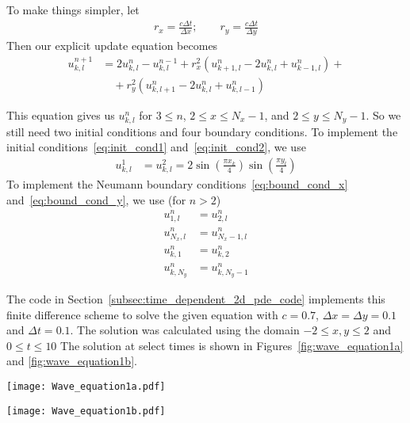 \documentclass[twocolumn]{myarticle}
\numberwithin{equation}{section}
\begin{document}
To make things simpler, let
\begin{align}
    r_x = \frac{c \Delta t}{ \Delta x}; \qquad r_y = \frac{c \Delta t }{ \Delta y }
\end{align}
Then our explicit update equation becomes
\begin{align}
    u^{n+1}_{k,l} &= 2 u^{n}_{k,l} - u^{n-1}_{k,l} + r_x^2 \left( u^{n}_{k+1,l} - 2 u^{n}_{k,l} + u^{n}_{k-1,l} \right) + \nonumber
    \\
    & \quad + r_y^2 \left( u^{n}_{k,l+1} - 2 u^{n}_{k,l} + u^{n}_{k,l-1} \right)
\end{align}

This equation gives us $ u^n_{k,l} $ for $ 3 \leq n $, $ 2 \leq x \leq N_x-1  $, and $ 2 \leq y \leq N_y-1   $.
So we still need two initial conditions and four boundary conditions.
To implement the initial conditions~\ref{eq:init_cond1} and~\ref{eq:init_cond2}, we use
\begin{align}
    u^1_{k,l} &= u^2_{k,l} = 2 \sin \left( \frac{\pi x_k}{4} \right) \sin \left( \frac{\pi y_l}{4} \right)
\end{align}
To implement the Neumann boundary conditions~\ref{eq:bound_cond_x} and~\ref{eq:bound_cond_y}, we use (for $ n > 2 $)
\begin{align}
    u^n_{1,l} &= u^n_{2,l}
    \\
    u^n_{N_x,l} &= u^n_{N_x-1,l}
    \\
    u^n_{k,1} &= u^n_{k,2}
    \\
    u^n_{k,N_y} &= u^n_{k,N_y-1}
\end{align}

The code in Section~\ref{subsec:time_dependent_2d_pde_code} implements this finite difference scheme to solve the given equation with $ c = 0.7 $, $ \Delta x = \Delta y = 0.1 $ and $ \Delta t = 0.1 $.
The solution was calculated using the domain $ -2 \leq x,y \leq 2 $ and $ 0 \leq t \leq 10 $
The solution at select times is shown in Figures~\ref{fig:wave_equation1a} and \ref{fig:wave_equation1b}.

\begin{figure*}[ht]
    \centering
    \texttt{[image: Wave\_equation1a.pdf]}
    \caption{Solution to the 2D wave equation with $ \Delta x = \Delta y = 0.1 $ at $ t = 0, 2, 4 $.}
    \label{fig:wave_equation1a}
\end{figure*}

\begin{figure*}[ht]
    \centering
    \texttt{[image: Wave\_equation1b.pdf]}
    \caption{Solution to the 2D wave equation with $ \Delta x = \Delta y = 0.1 $ at $ t = 6, 8, 10 $.}
    \label{fig:wave_equation1b}
\end{figure*}
\end{document}
